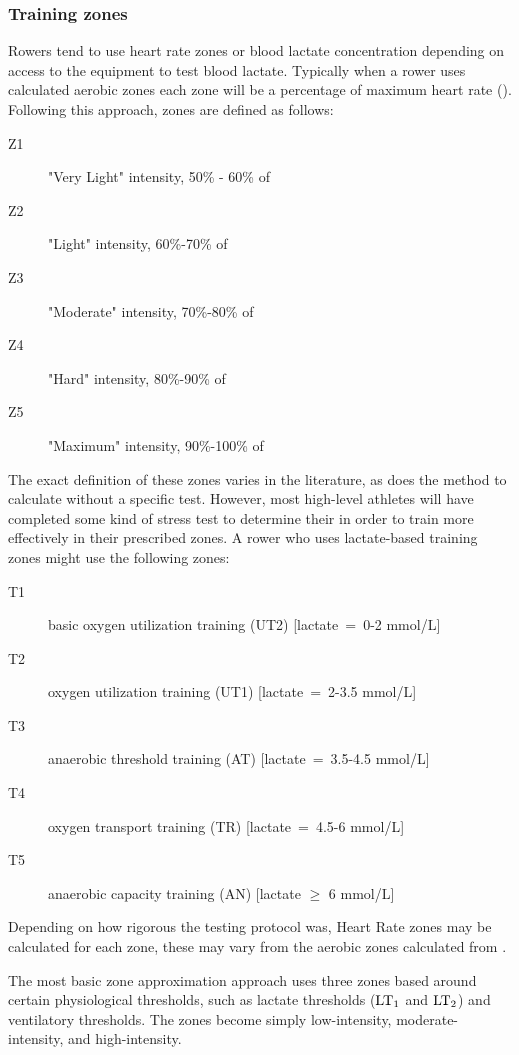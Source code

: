 \subsubsection{Training zones}
Rowers tend to use heart rate zones or blood lactate concentration depending on access to the equipment to test blood lactate. Typically when a rower uses calculated aerobic zones each zone will be a percentage of maximum heart rate (\maxHR). Following this approach, zones are defined as follows:
\begin{description}
  \item[Z1] "Very Light" intensity, 50\% - 60\% of \maxHR
  \item[Z2] "Light" intensity, 60\%-70\% of \maxHR
  \item[Z3] "Moderate" intensity, 70\%-80\% of \maxHR
  \item[Z4] "Hard" intensity, 80\%-90\% of \maxHR
  \item[Z5] "Maximum" intensity, 90\%-100\% of \maxHR
\end{description}
The exact definition of these zones varies in the literature, as does the method to calculate \maxHR without a specific test. However, most high-level athletes will have completed some kind of stress test to determine their \maxHR in order to train more effectively in their prescribed zones.
A rower who uses lactate-based training zones might use the following zones:
\begin{description}
  \item[T1]  basic oxygen utilization training (UT2) [lactate~=~0-2 mmol/L]
  \item[T2]  oxygen utilization training (UT1) [lactate~=~2-3.5 mmol/L]
  \item[T3]  anaerobic threshold training (AT) [lactate~=~3.5-4.5 mmol/L]
  \item[T4]  oxygen transport training (TR) [lactate~=~4.5-6 mmol/L]
  \item[T5]  anaerobic capacity training (AN) [lactate $\geq$ 6 mmol/L] \autocite{Das2022}
\end{description}
Depending on how rigorous the testing protocol was, Heart Rate zones may be calculated for each zone, these may vary from the aerobic zones calculated from \maxHR.

The most basic zone approximation approach uses three zones based around certain physiological thresholds, such as lactate thresholds ($\textnormal{LT}_\text{1}$ and $\textnormal{LT}_\text{2}$) and ventilatory thresholds. The zones become simply low-intensity, moderate-intensity, and high-intensity. 

